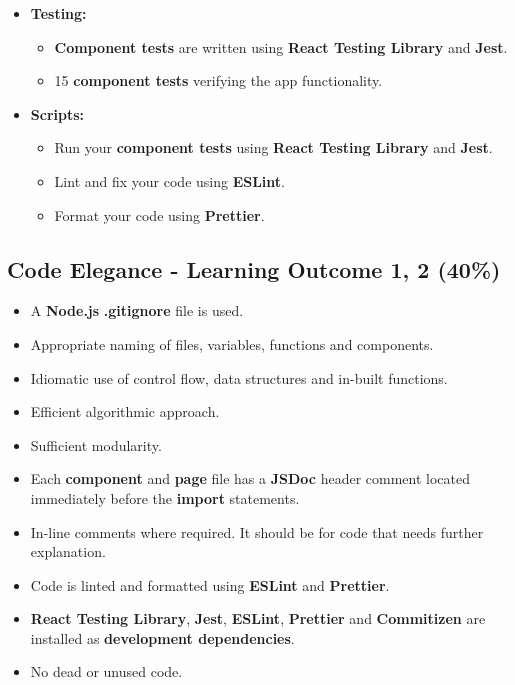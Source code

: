 \documentclass{article}
\begin{document}
\begin{itemize}
\item \textbf{Testing:}
\begin{itemize}
	\item \textbf{Component tests} are written using \textbf{React Testing Library} and \textbf{Jest}.
	\item 15 \textbf{component tests} verifying the app functionality.
\end{itemize}

\item \textbf{Scripts:}
\begin{itemize}
	\item Run your \textbf{component tests} using \textbf{React Testing Library} and \textbf{Jest}.
	\item Lint and fix your code using \textbf{ESLint}.
	\item Format your code using \textbf{Prettier}.
\end{itemize}
\end{itemize}

\subsection*{Code Elegance - Learning Outcome 1, 2 (40\%)}
\begin{itemize}
	\item A \textbf{Node.js} \textbf{.gitignore} file is used.
	\item Appropriate naming of files, variables, functions and components.
	\item Idiomatic use of control flow, data structures and in-built functions.
	\item Efficient algorithmic approach.
	\item Sufficient modularity.
	\item Each \textbf{component} and \textbf{page} file has a \textbf{JSDoc} header comment located immediately before the \textbf{import} statements.
	\item In-line comments where required. It should be for code that needs further explanation.
	\item Code is linted and formatted using \textbf{ESLint} and \textbf{Prettier}.
	\item \textbf{React Testing Library}, \textbf{Jest}, \textbf{ESLint}, \textbf{Prettier} and \textbf{Commitizen} are installed as \textbf{development dependencies}.	
	\item No dead or unused code.
\end{itemize}
\end{document}
